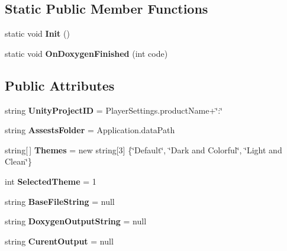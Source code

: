 \subsection*{Static Public Member Functions}
\begin{DoxyCompactItemize}
\item 
static void {\bfseries Init} ()\hypertarget{class_doxygen_window_a48f456c44b07cc9283a0583579b1d65a}{}\label{class_doxygen_window_a48f456c44b07cc9283a0583579b1d65a}

\item 
static void {\bfseries On\+Doxygen\+Finished} (int code)\hypertarget{class_doxygen_window_a2809a93b756a6cfc371ee76a9d7168d7}{}\label{class_doxygen_window_a2809a93b756a6cfc371ee76a9d7168d7}

\end{DoxyCompactItemize}
\subsection*{Public Attributes}
\begin{DoxyCompactItemize}
\item 
string {\bfseries Unity\+Project\+ID} = Player\+Settings.\+product\+Name+\char`\"{}\+:\char`\"{}\hypertarget{class_doxygen_window_a0c52f34973444c41e90151536dbd6e82}{}\label{class_doxygen_window_a0c52f34973444c41e90151536dbd6e82}

\item 
string {\bfseries Assests\+Folder} = Application.\+data\+Path\hypertarget{class_doxygen_window_a470870b3c6a44b3fe2f57870e39cfe55}{}\label{class_doxygen_window_a470870b3c6a44b3fe2f57870e39cfe55}

\item 
string\mbox{[}$\,$\mbox{]} {\bfseries Themes} = new string\mbox{[}3\mbox{]} \{\char`\"{}Default\char`\"{}, \char`\"{}Dark and Colorful\char`\"{}, \char`\"{}Light and Clean\char`\"{}\}\hypertarget{class_doxygen_window_a2dfb0ba26737a0e996797c2848cc2fc0}{}\label{class_doxygen_window_a2dfb0ba26737a0e996797c2848cc2fc0}

\item 
int {\bfseries Selected\+Theme} = 1\hypertarget{class_doxygen_window_aff9bfc8c7ed3f017a61e67025ea7c99a}{}\label{class_doxygen_window_aff9bfc8c7ed3f017a61e67025ea7c99a}

\item 
string {\bfseries Base\+File\+String} = null\hypertarget{class_doxygen_window_a7a4acfac0a07a2a05f183e4f0bc53b62}{}\label{class_doxygen_window_a7a4acfac0a07a2a05f183e4f0bc53b62}

\item 
string {\bfseries Doxygen\+Output\+String} = null\hypertarget{class_doxygen_window_a20e7d1bdb1f32c97f600bf0f0bdb2358}{}\label{class_doxygen_window_a20e7d1bdb1f32c97f600bf0f0bdb2358}

\item 
string {\bfseries Curent\+Output} = null\hypertarget{class_doxygen_window_a82b41ae2e3c44b050acc7603031ccd55}{}\label{class_doxygen_window_a82b41ae2e3c44b050acc7603031ccd55}

\end{DoxyCompactItemize}
